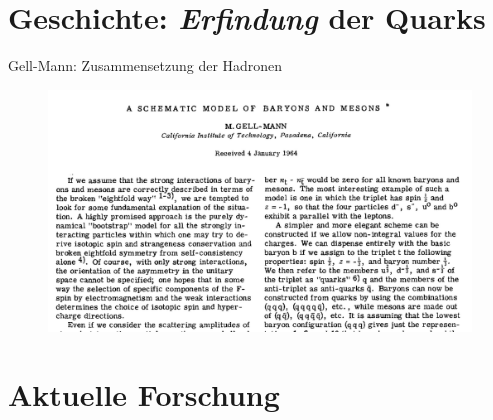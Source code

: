 \documentclass[aspectratio=169]{beamer} %
\begin{document}
      \section{Geschichte: \emph{\glqq Erfindung\grqq} der Quarks}
              \begin{frame}{Gell-Mann: Zusammensetzung der Hadronen}
                \begin{figure}\includegraphics[height=0.85\textheight, width=\textwidth, keepaspectratio]{Images/8ad56d13-e301-4a37-be9c-7077ac16ce16.jpg}\\\small\cite[S.~214]{GellMann.1964,Zweig.1964}\end{figure}
    \end{frame}

    \section[Die Suche nach Pentaquarks]{Aktuelle Forschung}
\end{document}
